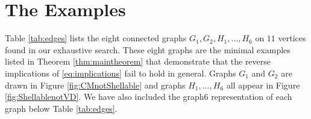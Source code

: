 \documentclass[10pt,a4paper]{amsart}
\theoremstyle{plain}
\theoremstyle{definition}
\theoremstyle{remark}
\numberwithin{equation}{section}
\numberwithin{equation}{section}
\begin{document}

\section{The Examples}\label{sec:examples}

Table \ref{tab:edges} lists the eight 
connected graphs $G_1, G_2,H_1,\ldots,H_6$ on $11$ vertices
found in our exhaustive search.  These 
eight graphs are the minimal examples listed in Theorem \ref{thm:maintheorem} that demonstrate that the 
reverse implications of \eqref{eq:implications}
fail to hold in general.  Graphs $G_1$ and $G_2$ are 
drawn in Figure \ref{fig:CMnotShellable} and graphs
$H_1,\ldots,H_6$ all appear in Figure \ref{fig:ShellablenotVD}.  
We have also included the graph6 representation of each
graph below Table \ref{tab:edges}.
\end{document}
